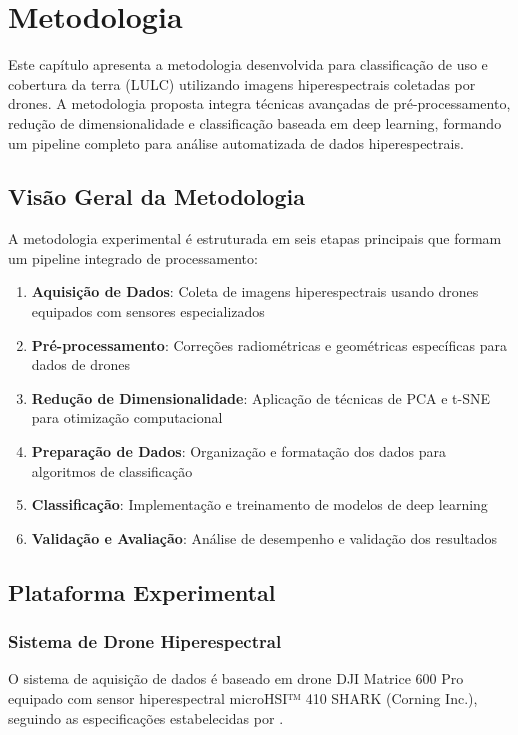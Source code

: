\chapter{Metodologia}\label{chp:metodologia}

Este capítulo apresenta a metodologia desenvolvida para classificação de uso e cobertura da terra (LULC) utilizando imagens hiperespectrais coletadas por drones. A metodologia proposta integra técnicas avançadas de pré-processamento, redução de dimensionalidade e classificação baseada em deep learning, formando um pipeline completo para análise automatizada de dados hiperespectrais.

\section{Visão Geral da Metodologia}\label{sec:visao_geral}

A metodologia experimental é estruturada em seis etapas principais que formam um pipeline integrado de processamento:

\begin{enumerate}
    \item \textbf{Aquisição de Dados}: Coleta de imagens hiperespectrais usando drones equipados com sensores especializados
    \item \textbf{Pré-processamento}: Correções radiométricas e geométricas específicas para dados de drones
    \item \textbf{Redução de Dimensionalidade}: Aplicação de técnicas de PCA e t-SNE para otimização computacional
    \item \textbf{Preparação de Dados}: Organização e formatação dos dados para algoritmos de classificação
    \item \textbf{Classificação}: Implementação e treinamento de modelos de deep learning
    \item \textbf{Validação e Avaliação}: Análise de desempenho e validação dos resultados
\end{enumerate}

\section{Plataforma Experimental}\label{sec:plataforma}

\subsection{Sistema de Drone Hiperespectral}
O sistema de aquisição de dados é baseado em drone DJI Matrice 600 Pro equipado com sensor hiperespectral microHSI™ 410 SHARK (Corning Inc.), seguindo as especificações estabelecidas por \cite{Shin2024}.

